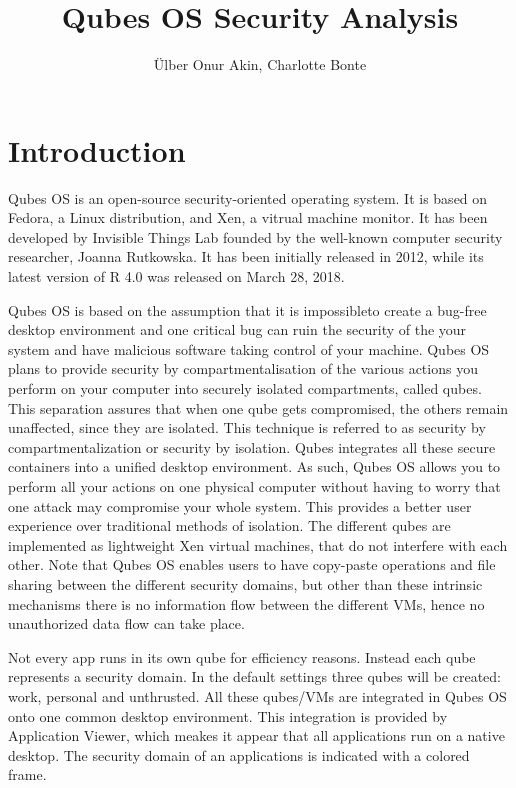 \documentclass[runningheads,a4paper]{article}
\begin{document}
\title{Qubes OS Security Analysis}

\author{\"Ulber Onur Akin, Charlotte Bonte}

\maketitle

\tableofcontents
\section{Introduction}

Qubes OS is an open-source security-oriented operating system.  It is
based on Fedora, a Linux distribution, and Xen, a vitrual machine
monitor.  It has been developed by Invisible Things Lab founded by the
well-known computer security researcher, Joanna Rutkowska. It has been
initially released in 2012, while its latest version of R 4.0 was
released on March 28, 2018.

Qubes OS is based on the assumption that it is impossibleto create a
bug-free desktop environment and one critical bug can ruin the
security of the your system and have malicious software taking control
of your machine. Qubes OS plans to provide security by
compartmentalisation of the various actions 
you perform on your computer into securely isolated compartments,
called qubes.  This separation assures that when one qube gets
compromised, the others remain unaffected, since they are isolated.
This technique is referred to as security by compartmentalization or
security by isolation.  Qubes integrates all these secure containers
into a unified desktop environment.  As such, Qubes OS allows you to
perform all your actions on one physical computer without having to
worry that one attack may compromise your whole system.  This provides
a better user experience over traditional methods of isolation.  The
different qubes are implemented as lightweight Xen virtual machines,
that do not interfere with each other.  Note that Qubes OS enables
users to have copy-paste operations and file sharing between the
different security domains, but other than these intrinsic mechanisms
there is no information flow between the different VMs, hence no
unauthorized data flow can take place.  

Not every app runs in its own qube for efficiency reasons. Instead
each qube represents a security domain. In the default settings three
qubes will be created: work, personal and unthrusted. All these
qubes/VMs are integrated in Qubes OS onto one common desktop
environment. This integration is provided by Application Viewer, which
meakes it appear that all applications run on a native desktop. The
security domain of an applications is indicated with a colored frame.
\end{document}

